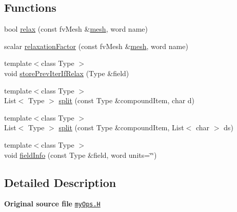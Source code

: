 \subsection*{Functions}
\begin{DoxyCompactItemize}
\item 
bool \hyperlink{namespaceFoam_1_1myOps_ae64b7628dd8a488daf43b4530d219792}{relax} (const fv\+Mesh \&\hyperlink{createMeshesPostProcess_8H_a8bb1e58291d2d2b653e024a4f4bffe38}{mesh}, word name)
\item 
scalar \hyperlink{namespaceFoam_1_1myOps_afeb41c0b205c62740edc6190b2143111}{relaxation\+Factor} (const fv\+Mesh \&\hyperlink{createMeshesPostProcess_8H_a8bb1e58291d2d2b653e024a4f4bffe38}{mesh}, word name)
\item 
{\footnotesize template$<$class Type $>$ }\\void \hyperlink{namespaceFoam_1_1myOps_abeee007f59aa62edc180f978d5d730dc}{store\+Prev\+Iter\+If\+Relax} (Type \&field)
\item 
{\footnotesize template$<$class Type $>$ }\\List$<$ Type $>$ \hyperlink{namespaceFoam_1_1myOps_a9c6941fd6343a31e270e81867634452e}{split} (const Type \&compound\+Item, char d)
\item 
{\footnotesize template$<$class Type $>$ }\\List$<$ Type $>$ \hyperlink{namespaceFoam_1_1myOps_acee49ca9cdd20d6fb1250c0eff9bd2d0}{split} (const Type \&compound\+Item, List$<$ char $>$ ds)
\item 
{\footnotesize template$<$class Type $>$ }\\void \hyperlink{namespaceFoam_1_1myOps_a7c1be504bf64208dff04f082c8efda62}{field\+Info} (const Type \&field, word units=\char`\"{}\char`\"{})
\end{DoxyCompactItemize}


\subsection{Detailed Description}
{\bfseries Original source file} \href{../../../home/carlo/data/GeN-Foam/GeN-Foam_ffn/GeN-Foam/GeN-Foam/classes/thermalHydraulics/src/include/myOps.H}{\tt my\+Ops.\+H} 